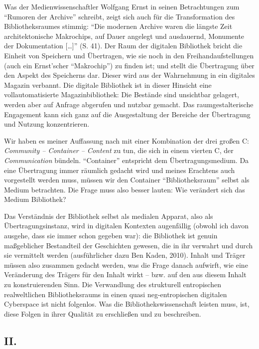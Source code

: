 \documentclass[output=paper]{langscibook}
\begin{document}
Was der Medienwissenschaftler Wolfgang Ernst in seinen Betrachtungen zum
\enquote{Rumoren der Archive} schreibt, zeigt sich auch für die
Transformation des Bibliotheksraumes stimmig: \enquote{Die modernen
Archive waren die längste Zeit architektonische Makrochips, auf Dauer
angelegt und ausdauernd, Monumente der Dokumentation {[}\ldots{]}} (S.
41). Der Raum der digitalen Bibliothek bricht die Einheit von Speichern
und Übertragen, wie sie noch in den Freihandaufstellungen (auch ein
Ernst'scher \enquote{Makrochip}) zu finden ist; und stellt die
Übertragung über den Aspekt des Speicherns dar. Dieser wird aus der
Wahrnehmung in ein digitales Magazin verbannt. Die digitale Bibliothek
ist in dieser Hinsicht eine vollautomatisierte Magazinbibliothek: Die
Bestände sind unsichtbar gelagert, werden aber auf Anfrage abgerufen und
nutzbar gemacht. Das raumgestalterische Engagement kann sich ganz auf
die Ausgestaltung der Bereiche der Übertragung und Nutzung
konzentrieren.

Wir haben es meiner Auffassung nach mit einer Kombination der drei
großen C: \emph{Community -- Container -- Content} zu tun, die sich in
einem vierten C, der \emph{Communication} bündeln. \enquote{Container}
entspricht dem Übertragungsmedium. Da eine Übertragung immer räumlich
gedacht wird und meines Erachtens auch vorgestellt werden muss, müssen
wir den Container \enquote{Bibliotheksraum} selbst als Medium
betrachten. Die Frage muss also besser lauten: Wie verändert sich das
Medium Bibliothek?

Das Verständnis der Bibliothek selbst als medialen Apparat, also als
Übertragungsinstanz, wird in digitalen Kontexten augenfällig (obwohl ich
davon ausgehe, dass sie immer schon gegeben war): die Bibliothek ist
genuin maßgeblicher Bestandteil der Geschichten gewesen, die in ihr
verwahrt und durch sie vermittelt werden (ausführlicher dazu Ben Kaden,
2010). Inhalt und Träger müssen also zusammen gedacht werden, was die
Frage danach aufwirft, wie eine Veränderung des Trägers für den Inhalt
wirkt -- bzw. auf den aus diesem Inhalt zu konstruierenden Sinn. Die
Verwandlung des strukturell entropischen realweltlichen Bibliotheksraums
in einen quasi neg-entropischen digitalen Cyberspace ist nicht
folgenlos. Was die Bibliothekswissenschaft leisten muss, ist, diese
Folgen in ihrer Qualität zu erschließen und zu beschreiben.

\hypertarget{ii.}{%
\subsection*{II.}\label{ii.}}
\end{document}
